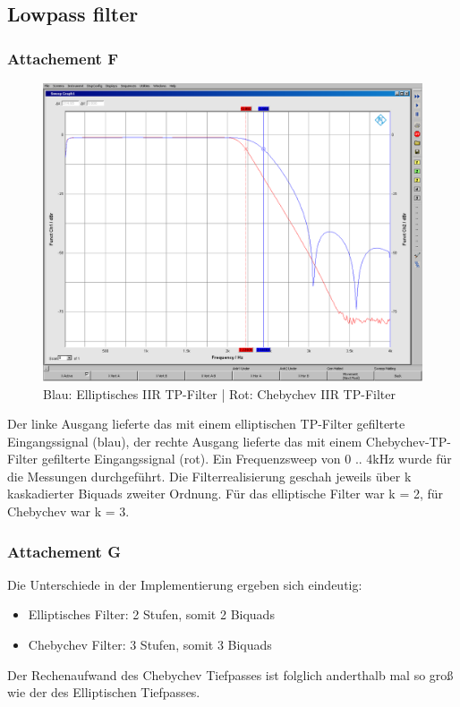 \subsection{Lowpass filter}
\subsubsection{Attachement F}

	\begin{figure}[h]
		\centering
		\includegraphics[width=0.8\linewidth]{Bilder/EllipCheby}
		\caption{Blau: Elliptisches IIR TP-Filter | Rot: Chebychev IIR TP-Filter}
		\label{fig:EllipCheby}
	\end{figure}
	
\noindent Der linke Ausgang lieferte das mit einem elliptischen TP-Filter gefilterte Eingangssignal (blau), der rechte Ausgang lieferte das mit einem Chebychev-TP-Filter gefilterte Eingangssignal (rot). Ein Frequenzsweep von 0 .. 4kHz wurde für die Messungen durchgeführt. Die Filterrealisierung geschah jeweils über k kaskadierter Biquads zweiter Ordnung. Für das elliptische Filter war k = 2, für Chebychev war k = 3.

\subsubsection{Attachement G}
\noindent Die Unterschiede in der Implementierung ergeben sich eindeutig:
\begin{itemize}
	\item Elliptisches Filter: 2 Stufen, somit 2 Biquads
	\item Chebychev Filter: 3 Stufen, somit 3 Biquads
\end{itemize}
\noindent Der Rechenaufwand des Chebychev Tiefpasses ist folglich anderthalb mal so groß wie der des Elliptischen Tiefpasses.

